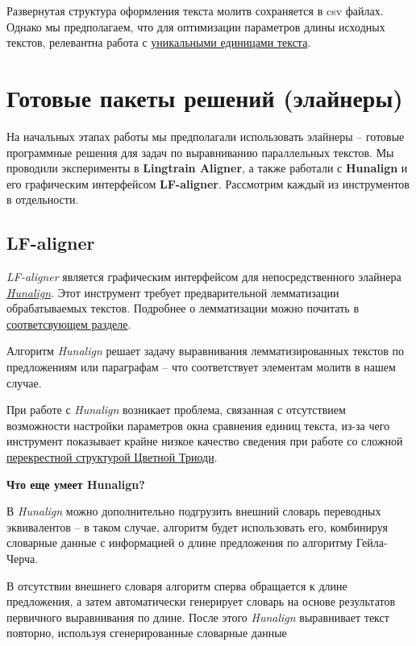 \documentclass[
  letterpaper,
]{book}
\begin{document}
Развернутая структура оформления текста молитв сохраняется в csv файлах.
Однако мы предполагаем, что для оптимизации параметров длины исходных
текстов, релевантна работа с
\href{https://github.com/Drozhzhinastya/GSPC/tree/main/texts/unique_units}{уникальными
единицами текста}.


\hypertarget{sec-about_aligners}{%
\chapter{Готовые пакеты решений (элайнеры)}\label{sec-about_aligners}}

На начальных этапах работы мы предполагали использовать элайнеры --
готовые программные решения для задач по выравниванию параллельных
текстов. Мы проводили эксперименты в \textbf{Lingtrain Aligner}, а также
работали с \textbf{Hunalign} и его графическим интерфейсом
\textbf{LF-aligner}. Рассмотрим каждый из инструментов в отдельности.

\hypertarget{sec-lf_aligner}{%
\section{LF-aligner}\label{sec-lf_aligner}}

\emph{LF-aligner} является графическим интерфейсом для непосредственного
элайнера
\emph{\href{https://github.com/danielvarga/hunalign}{Hunalign}}. Этот
инструмент требует предварительной лемматизации обрабатываемых текстов.
Подробнее о лемматизации можно почитать в
\protect\hyperlink{sec-about_lemmatization}{соответсвующем разделе}.

Алгоритм \emph{Hunalign} решает задачу выравнивания лемматизированных
текстов по предложениям или параграфам -- что соответствует элементам
молитв в нашем случае.

При работе с \emph{Hunalign} возникает проблема, связанная с отсутствием
возможности настройки параметров окна сравнения единиц текста, из-за
чего инструмент показывает крайне низкое качество сведения при работе со
сложной \protect\hyperlink{sec-element_order}{перекрестной структурой
Цветной Триоди}.

\begin{tcolorbox}[enhanced jigsaw, rightrule=.15mm, breakable, colframe=quarto-callout-note-color-frame, colback=white, leftrule=.75mm, left=2mm, arc=.35mm, opacityback=0, toprule=.15mm, bottomrule=.15mm]

\textbf{Что еще умеет Hunalign?}\vspace{2mm}

В \emph{Hunalign} можно дополнительно подгрузить внешний словарь
переводных эквивалентов -- в таком случае, алгоритм будет использовать
его, комбинируя словарные данные с информацией о длине предложения по
алгоритму Гейла-Черча.\footnotemark{}

В отсутствии внешнего словаря алгоритм сперва обращается к длине
предложения, а затем автоматически генерирует словарь на основе
результатов первичного выравнивания по длине. После этого
\emph{Hunalign} выравнивает текст повторно, используя сгенерированные
словарные данные

\end{tcolorbox}
\end{document}
